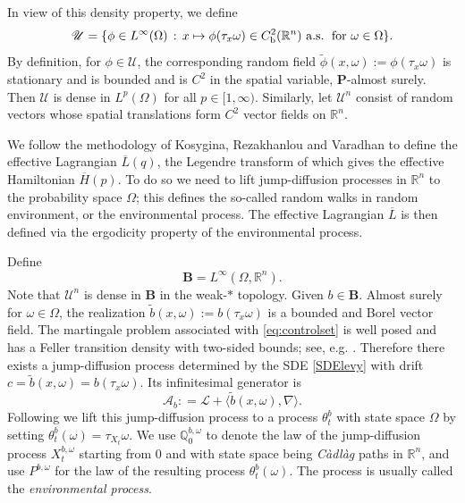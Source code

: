 \documentclass[11pt,reqno]{amsart}
\theoremstyle{definition}
\theoremstyle{remark}
\numberwithin{equation}{section}
\newcommand{\R}{{\mathbb{R}}}
\begin{document}
In view of this density property, we define
\begin{equation}
\label{eq:C2U}
    \mathscr{U} = \{ \phi\in L^{\infty}(\Omega) \,:\, x\mapsto \phi(\tau_{x}\omega) \in C^{2}_{\rm b}(\mathbb{R}^n) \text{ a.s.\, for $\omega \in \Omega$}\} .
\end{equation}
By definition, for $\phi \in \mathscr{U}$, the corresponding random field $\widetilde \phi(x,\omega) := \phi(\tau_x \omega)$ is stationary and is bounded and is $C^2$ in the spatial variable, $\mathbf{P}$-almost surely. Then $\mathscr{U}$ is dense in $L^p(\Omega)$ for all $p\in [1,\infty)$. Similarly, let $\mathscr{U}^n$ consist of random vectors whose spatial translations form $C^2$ vector fields on $\R^n$.


We follow the methodology of Kosygina, Rezakhanlou and Varadhan \cite{KRV06} to define the effective Lagrangian $\overline{L}(q)$, the Legendre transform of which gives the effective Hamiltonian $\overline{H}(p)$. To do so we need to lift jump-diffusion processes in $\R^n$ to the probability space $\Omega$; this defines the so-called random walks in random environment, or the environmental process. The effective Lagrangian $\overline{L}$ is then defined via the ergodicity property of the environmental process. 

Define
\begin{equation}
\label{eq:vfB}
    \mathbf{B} =  L^{\infty}(\Omega,\mathbb{R}^n).
\end{equation}
Note that $\mathscr{U}^n$ is dense in $\mathbf{B}$ in the weak-$*$ topology. Given $b\in\mathbf{B}$. Almost surely for $\omega\in\Omega$, the realization $\widetilde b(x,\omega):= b(\tau_{x}\omega)$ is a bounded and Borel vector field. 
The martingale problem associated with \eqref{eq:controlset} is well posed and has a Feller transition density with two-sided bounds; see, e.g. \cite{ChenZhang2018}.
Therefore there exists a jump-diffusion process determined by the SDE \eqref{SDElevy} with drift $c=\widetilde{b}(x,\omega)=b(\tau_x\omega)$. Its infinitesimal generator is
\begin{equation*}
\mathcal{A}_{b}: = \mathscr{L} + \langle \widetilde b(x,\omega), \nabla \rangle.
\end{equation*}
Following \cite{KRV06} we lift this jump-diffusion process to a process $\theta^b_t$ with state space $\Omega$ by setting $\theta^b_t(\omega) = \tau_{X_t}\omega$. We use $\mathbb{Q}^{b,\omega}_0$ to denote the law of the jump-diffusion process $X_t^{b,\omega}$ starting from $0$ and with state space being \emph{C\`adl\`ag} paths in $\R^n$, and use $P^{b,\omega}$ for the law of the resulting process $\theta^b_t(\omega)$. The process is usually called the \emph{environmental process}. 
\end{document}
